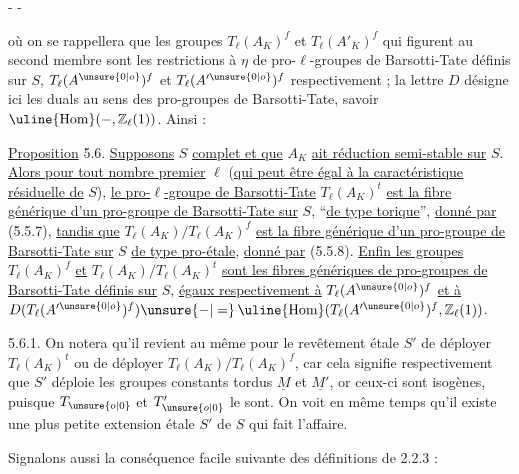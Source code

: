 \begin{center}-  -\end{center}
\margin{$=$}
\margin{-}

où on se rappellera que les groupes $T_\ell(A_K)^f$ et $T_\ell(A'_K)^f$ qui figurent au second membre sont les restrictions à $\eta$ de pro-$\ell$-groupes de Barsotti-Tate définis sur $S$, $T_\ell(A^{\unsure{0|o}})^f$ et $T_\ell(A'^{\unsure{0|o}})^f$ respectivement ; la lettre $D$ désigne ici les duals au sens des pro-groupes de Barsotti-Tate, savoir $\operatorname{\uline{Hom}}(-,\mathbb Z_\ell(1))$. Ainsi :

\uline{Proposition} 5.6. \uline{Supposons} $S$ \uline{complet et que} $A_K$ \uline{ait réduction semi-stable sur} $S$. \uline{Alors pour tout nombre premier} $\ell$ (\uline{qui peut être égal à la caractéristique résiduelle de} $S$), \uline{le pro-}$\ell$\uline{-groupe de Barsotti-Tate} $T_\ell(A_K)^t$ \uline{est la fibre générique d'un pro-groupe de Barsotti-Tate sur} $S$, ``\uline{de type torique}'', \uline{donné par} (5.5.7), \uline{tandis que} $T_\ell(A_K)/T_\ell(A_K)^f$ \uline{est la fibre générique d'un pro-groupe de Barsotti-Tate sur} $S$ \uline{de type pro-étale}, \uline{donné par} (5.5.8). \uline{Enfin les groupes} $T_\ell(A_K)^f$ \uline{et} $T_\ell(A_K)/T_\ell(A_K)^t$ \uline{sont les fibres génériques de pro-groupes de Barsotti-Tate définis sur} $S$, \uline{égaux respectivement à} $T_\ell(A^{\unsure{0|o}})^f$ \uline{et à} $D(T_\ell(A'^{\unsure{0|o}})^f)\unsure{-|=}\operatorname{\uline{Hom}}(T_\ell(A'^{\unsure{0|o}})^f,\mathbb Z_\ell(1))$.

5.6.1. On notera qu'il revient au même pour le revêtement étale $S'$ de déployer $T_\ell(A_K)^t$ ou de déployer $T_\ell(A_K)/T_\ell(A_K)^f$, car cela signifie respectivement que $S'$ déploie les groupes constants tordus $\underline M$ et $\underline{M'}$, or ceux-ci sont isogènes, puisque $T_{\unsure{o|0}}$ et $T'_{\unsure{o|0}}$ le sont. On voit en même temps qu'il existe une plus petite extension étale $S'$ de $S$ qui fait l'affaire.

Signalons aussi la conséquence facile suivante des définitions de 2.2.3 :

\margin{-}
